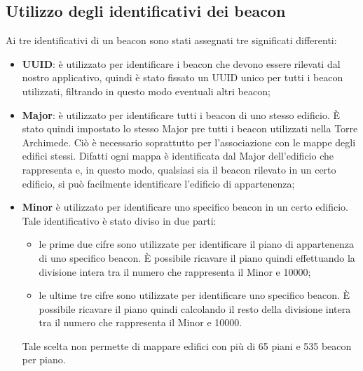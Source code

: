 \documentclass[../DocumentazioneDelloStudio.tex]{subfiles}
\begin{document}
	\subsection{Utilizzo degli identificativi dei beacon}
	Ai tre identificativi di un beacon sono stati assegnati tre significati differenti:
	\begin{itemize}
		\item \textbf{UUID}: è utilizzato per identificare i beacon che devono essere rilevati dal nostro applicativo, quindi è stato fissato un UUID unico per tutti i beacon utilizzati, filtrando in questo modo eventuali altri beacon;
		\item \textbf{Major}: è utilizzato per identificare tutti i beacon di uno stesso edificio. È stato quindi impostato lo stesso Major pre tutti i beacon utilizzati nella Torre Archimede. Ciò è necessario soprattutto per l'associazione con le mappe degli edifici stessi. Difatti ogni mappa è identificata dal Major dell'edificio che rappresenta e, in questo modo, qualsiasi sia il beacon rilevato in un certo edificio, si può facilmente identificare l'edificio di appartenenza;
		\item \textbf{Minor} è utilizzato per identificare uno specifico beacon in un certo edificio. Tale identificativo è stato diviso in due parti:
		\begin{itemize}
			\item le prime due cifre sono utilizzate per identificare il piano di appartenenza di uno specifico beacon. È possibile ricavare il piano quindi effettuando la divisione intera tra il numero che rappresenta il Minor e 10000;
			\item le ultime tre cifre sono utilizzate per identificare uno specifico beacon. È possibile ricavare il piano quindi calcolando il resto della divisione intera tra il numero che rappresenta il Minor e 10000.
		\end{itemize}
		Tale scelta non permette di mappare edifici con più di 65 piani e 535 beacon per piano. 
	\end{itemize}
\end{document}
